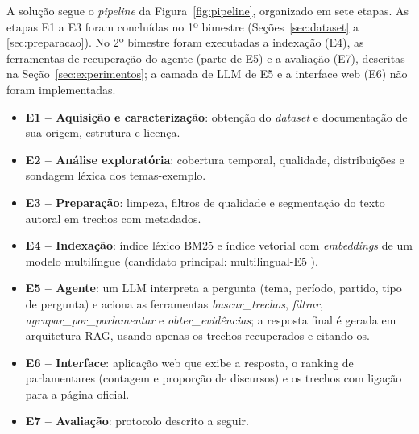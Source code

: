 \documentclass[12pt]{article}
\begin{document}
A solução segue o \textit{pipeline} da Figura~\ref{fig:pipeline}, organizado em sete etapas. As
etapas E1 a E3 foram concluídas no 1º bimestre (Seções~\ref{sec:dataset} a
\ref{sec:preparacao}). No 2º bimestre foram executadas a indexação (E4), as ferramentas de
recuperação do agente (parte de E5) e a avaliação (E7), descritas na Seção~\ref{sec:experimentos};
a camada de LLM de E5 e a interface web (E6) não foram implementadas.

\begin{itemize}
  \item \textbf{E1 -- Aquisição e caracterização}: obtenção do \textit{dataset} e documentação de
  sua origem, estrutura e licença.
  \item \textbf{E2 -- Análise exploratória}: cobertura temporal, qualidade, distribuições e
  sondagem léxica dos temas-exemplo.
  \item \textbf{E3 -- Preparação}: limpeza, filtros de qualidade e segmentação do texto autoral em
  trechos com metadados.
  \item \textbf{E4 -- Indexação}: índice léxico BM25 e índice vetorial com \textit{embeddings} de
  um modelo multilíngue (candidato principal: multilingual-E5 \cite{wang2024e5}).
  \item \textbf{E5 -- Agente}: um LLM interpreta a pergunta (tema, período, partido, tipo de
  pergunta) e aciona as ferramentas \emph{buscar\_trechos}, \emph{filtrar},
  \emph{agrupar\_por\_parlamentar} e \emph{obter\_evidências}; a resposta final é gerada em
  arquitetura RAG, usando apenas os trechos recuperados e citando-os.
  \item \textbf{E6 -- Interface}: aplicação web que exibe a resposta, o ranking de parlamentares
  (contagem e proporção de discursos) e os trechos com ligação para a página oficial.
  \item \textbf{E7 -- Avaliação}: protocolo descrito a seguir.
\end{itemize}
\end{document}
